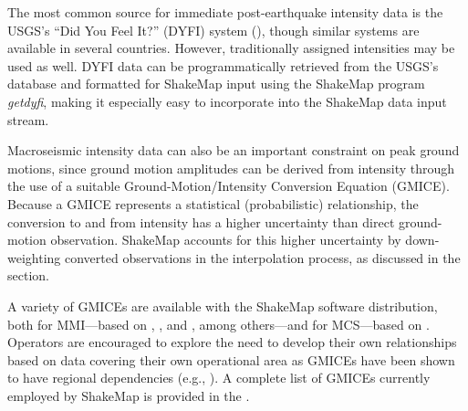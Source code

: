 \documentclass[letterpaper,10pt,english]{sphinxmanual}
\begin{document}
The most common source for immediate post-earthquake intensity data is the USGS's
“Did You Feel It?” (DYFI) system ({\hyperref[references:wald2011c]{}}), though similar systems are
available in several countries. However, traditionally assigned intensities may be used as
well. DYFI data can be programmatically retrieved from the USGS's database and
formatted for ShakeMap input using the ShakeMap program \emph{getdyfi}, making it
especially easy to incorporate into the ShakeMap data input stream.

Macroseismic intensity data can also be an important constraint on peak ground motions,
since ground motion amplitudes can be derived from intensity through the use of a suitable Ground-Motion/Intensity
Conversion Equation (GMICE). Because a GMICE represents a statistical (probabilistic)
relationship, the conversion to and from intensity has a higher uncertainty than direct
ground-motion observation. ShakeMap accounts for this higher uncertainty by down-
weighting converted observations in the interpolation process, as discussed in the
{\hyperref[tg_processing:sec\string-interpolation]{}} section.

A variety of GMICEs are available with the ShakeMap software distribution, both for
MMI---based on {\hyperref[references:wald1999b]{}}, {\hyperref[references:worden2012]{}},
and {\hyperref[references:atkinson2007]{}}, among others---and for MCS---based on {\hyperref[references:faenza2010]{}}. Operators are
encouraged to explore the need to develop their own relationships based on data covering
their own operational area as GMICEs have been shown to have regional dependencies
(e.g., {\hyperref[references:caprio2015]{}}). A complete list of GMICEs currently employed by ShakeMap is
provided in the {\hyperref[software_guide:sm35\string-software\string-guide]{}}.
\end{document}
